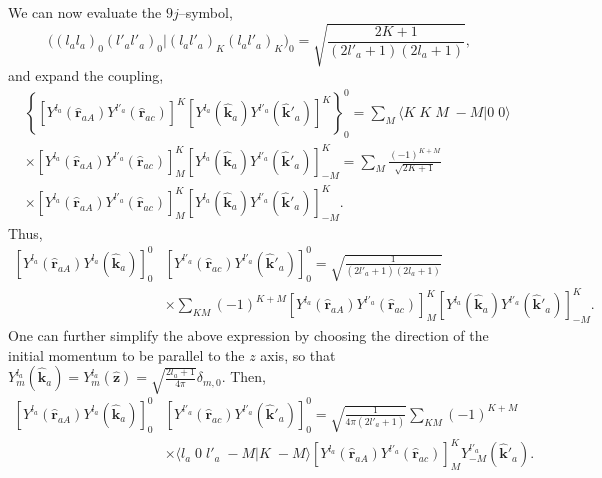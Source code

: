 We can now evaluate the $9j$--symbol,
\begin{equation}\label{eqC6AppG11}
\bigl((l_a l_a)_0(l'_a l'_a)_0|(l_a l'_a)_K(l_a l'_a)_K\bigr)_0=\sqrt{\frac{2K+1}{(2l'_a+1)(2l_a+1)}},
\end{equation}
and expand the coupling,
\begin{equation}\label{eqC6AppG12}
\begin{split}
&\left\{\left[ Y^{l_a}(\hat{\mathbf r}_{aA})  Y^{l'_a} (\hat{ \mathbf r}_{ac})\right]^K \left[Y^{l_a} (\hat{\mathbf k}_{a}) Y^{l'_a} (\hat{ \mathbf k}'_{a})\right]^K\right\}^0_0=\sum_M \langle K\;K\;M\;-M|0\;0\rangle\\
&\times \left[ Y^{l_a} (\hat{\mathbf r}_{aA}) Y^{l'_a} (\hat{ \mathbf r}_{ac})\right]^K_M \left[Y^{l_a} (\hat{\mathbf k}_{a}) Y^{l'_a} (\hat{ \mathbf k}'_{a})\right]^K_{-M}=\sum_M\frac{(-1)^{K+M}}{\sqrt{2K+1}}\\
&\times \left[ Y^{l_a} (\hat{\mathbf r}_{aA}) Y^{l'_a} (\hat{ \mathbf r}_{ac})\right]^K_M \left[Y^{l_a} (\hat{\mathbf k}_{a}) Y^{l'_a} (\hat{ \mathbf k}'_{a})\right]^K_{-M}.
\end{split}
\end{equation}
Thus,
\begin{equation}\label{eqC6AppG13}
\begin{split}
\left[ Y^{l_a} (\hat{\mathbf r}_{aA}) Y^{l_a} (\hat{ \mathbf k}_{a})\right]^0_0 & \left[ Y^{l'_a} (\hat{\mathbf r}_{ac}) Y^{l'_a} (\hat{ \mathbf k}'_{a})\right]^0_0=\sqrt{\frac{1}{(2l'_a+1)(2l_a+1)}}\\
&\times\sum_{KM}(-1)^{K+M}\left[ Y^{l_a} (\hat{\mathbf r}_{aA}) Y^{l'_a} (\hat{ \mathbf r}_{ac})\right]^K_M \left[Y^{l_a} (\hat{\mathbf k}_{a}) Y^{l'_a} (\hat{ \mathbf k}'_{a})\right]^K_{-M}.
\end{split}
\end{equation}
One can further simplify the above expression by choosing the direction of the initial momentum to be parallel to the $z$ axis, so that $Y^{l_a}_m (\hat{\mathbf k}_{a})=Y^{l_a}_m (\hat{\mathbf z})=\sqrt{\frac{2l_a+1}{4\pi}}\delta_{m,0}$. Then,
\begin{equation}\label{eqC6AppF10}
\begin{split}
\left[ Y^{l_a} (\hat{\mathbf r}_{aA}) Y^{l_a} (\hat{ \mathbf k}_{a})\right]^0_0 & \left[ Y^{l'_a} (\hat{\mathbf r}_{ac}) Y^{l'_a} (\hat{ \mathbf k}'_{a})\right]^0_0=\sqrt{\frac{1}{4\pi(2l'_a+1)}}\sum_{KM}(-1)^{K+M}\\
&\times\langle l_a\;0\;l'_a\;-M|K\;-M\rangle\left[ Y^{l_a} (\hat{\mathbf r}_{aA}) Y^{l'_a} (\hat{ \mathbf r}_{ac})\right]^K_M   Y^{l'_a}_{-M} (\hat{ \mathbf k}'_{a}).
\end{split}
\end{equation}
